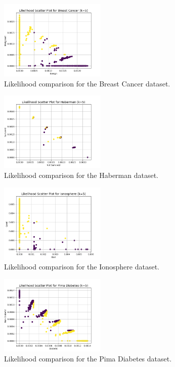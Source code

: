 \documentclass[conference]{IEEEtran}
\begin{document}
\begin{figure}[htbp]
    \centering
    \includegraphics[width=0.45\textwidth]{../scripts/comparison_results/Breast Cancer_likelihood.png}
    \caption{Likelihood comparison for the Breast Cancer dataset.}
    \label{fig:breast_cancer_likelihood}
\end{figure}

\begin{figure}[htbp]
    \centering
    \includegraphics[width=0.45\textwidth]{../scripts/comparison_results/Haberman_likelihood.png}
    \caption{Likelihood comparison for the Haberman dataset.}
    \label{fig:haberman_likelihood}
\end{figure}

\begin{figure}[htbp]
    \centering
    \includegraphics[width=0.45\textwidth]{../scripts/comparison_results/Ionosphere_likelihood.png}
    \caption{Likelihood comparison for the Ionosphere dataset.}
    \label{fig:ionosphere_likelihood}
\end{figure}

\begin{figure}[htbp]
    \centering
    \includegraphics[width=0.45\textwidth]{../scripts/comparison_results/Pima Diabetes_likelihood.png}
    \caption{Likelihood comparison for the Pima Diabetes dataset.}
    \label{fig:pima_diabetes_likelihood}
\end{figure}
\end{document}
